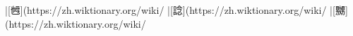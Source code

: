 |[乸](https://zh.wiktionary.org/wiki/%
|[諗](https://zh.wiktionary.org/wiki/%
|[嬲](https://zh.wiktionary.org/wiki/%
